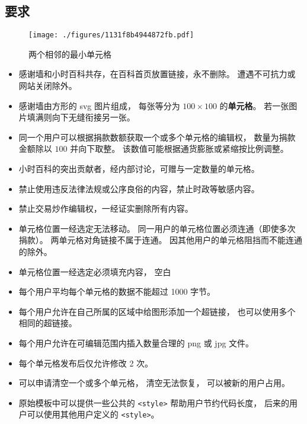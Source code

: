 
\begin{issues}
\issueDraft
{}
\end{issues}

\subsection{要求}

\begin{figure}[ht]
\centering
\texttt{[image: ./figures/1131f8b4944872fb.pdf]}
\caption{两个相邻的最小单元格} \label{fig_thanks_1}
\end{figure}

\begin{itemize}
\item 感谢墙和小时百科共存，在百科首页放置链接，永不删除。 遭遇不可抗力或网站关闭除外。
\item 感谢墙由方形的 svg 图片组成， 每张等分为 $100\times 100$ 的\textbf{单元格}。 若一张图片填满则向下无缝衔接另一张。
\item 同一个用户可以根据捐款数额获取一个或多个单元格的编辑权， 数量为捐款金额除以 $100$ 并向下取整。 该数值可能根据通货膨胀或紧缩按比例调整。
\item 小时百科的突出贡献者，经内部讨论，可赠与一定数量的单元格。
\item 禁止使用违反法律法规或公序良俗的内容，禁止时政等敏感内容。
\item 禁止交易炒作编辑权，一经证实删除所有内容。
\item 单元格位置一经选定无法移动。 同一用户的单元格位置必须连通（即使多次捐款）。 两单元格对角链接不属于连通。 因其他用户的单元格阻挡而不能连通的除外。
\item 单元格位置一经选定必须填充内容， 空白
\item 每个用户平均每个单元格的数据不能超过 1000 字节。
\item 每个用户允许在自己所属的区域中给图形添加一个超链接， 也可以使用多个相同的超链接。
\item 每个用户允许在可编辑范围内插入数量合理的 png 或 jpg 文件。
\item 每个单元格发布后仅允许修改 2 次。
\item 可以申请清空一个或多个单元格， 清空无法恢复， 可以被新的用户占用。
\item 原始模板中可以提供一些公共的 \verb`<style>` 帮助用户节约代码长度， 后来的用户可以使用其他用户定义的 \verb`<style>`。
\end{itemize}

